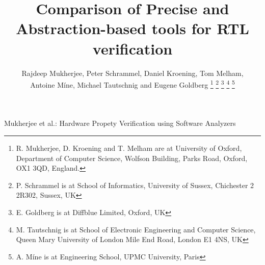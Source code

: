 \documentclass[journal]{IEEEtran}
\theoremstyle{definition}
\begin{document}
\title{Comparison of Precise and Abstraction-based tools for RTL verification} 

\author{Rajdeep Mukherjee, 
        Peter Schrammel,
        Daniel Kroening, 
        Tom Melham, \\
        Antoine M{\'i}ne,
        Michael Tautschnig and
        Eugene Goldberg
        \thanks{R. Mukherjee, D. Kroening and T. Melham are at 
                University of Oxford, Department of Computer Science,
                Wolfson Building, Parks Road,
                Oxford, OX1 3QD, England.}
        \thanks{P. Schrammel is at School of Informatics, University of Sussex, 
                Chichester 2 2R302, Sussex, UK}
        \thanks{E. Goldberg is at Diffblue Limited, Oxford, UK}
        \thanks{M. Tautschnig is at 
                School of Electronic Engineering and Computer Science,
                Queen Mary University of London
                Mile End Road, London E1 4NS, UK}
        \thanks{A. M{\'i}ne is at Engineering School, UPMC University, Paris}}
%
         {Mukherjee et al.: Hardware Propety Verification using Software Analyzers}

\maketitle
\end{document}
